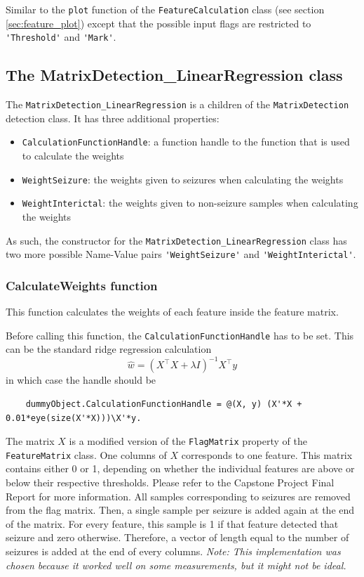\documentclass[usletter, 11pt]{extarticle}
\begin{document}
Similar to the \verb|plot| function of the \verb|FeatureCalculation| class (see section \ref{sec:feature_plot}) except that the possible input flags are restricted to \verb|'Threshold'| and \verb|'Mark'|.


\subsection{The MatrixDetection\_LinearRegression class} \label{sec:linear_regression}

The  \verb|MatrixDetection_LinearRegression| is a children of the \verb|MatrixDetection| detection class. It has three additional properties:

\begin{itemize}
	\item \texttt{CalculationFunctionHandle}: a function handle to the function that is used to calculate the weights
	\item \texttt{WeightSeizure}: the weights given to seizures when calculating the weights
	\item \texttt{WeightInterictal}: the weights given to non-seizure samples when calculating the weights
\end{itemize}

As such, the constructor for the \verb|MatrixDetection_LinearRegression| class has two more possible Name-Value pairs \verb|'WeightSeizure'| and \verb|'WeightInterictal'|.

\subsubsection{CalculateWeights function}

This function calculates the weights of each feature inside the feature matrix. 

Before calling this function, the \verb|CalculationFunctionHandle| has to be set. This can be the standard ridge regression calculation $$\hat{w} = (X^{\top}X + \lambda I)^{-1} X^{\top}y$$ in which case the handle should be
\begin{Verbatim}
	dummyObject.CalculationFunctionHandle = @(X, y) (X'*X + 0.01*eye(size(X'*X)))\X'*y.
\end{Verbatim}

The matrix $X$ is a modified version of the \verb|FlagMatrix| property of the \verb|FeatureMatrix| class. One columns of $X$ corresponds to one feature. This matrix contains either 0 or 1, depending on whether the individual features are above or below their respective thresholds. Please refer	 to the Capstone Project Final Report for more information. All samples corresponding to seizures are removed from the flag matrix. Then, a single sample per seizure is added again at the end of the matrix. For every feature, this sample is 1 if that feature detected that seizure and zero otherwise. Therefore, a vector of length equal to the number of seizures is added at the end of every columns. \emph{Note: This implementation was chosen because it worked well on some measurements, but it might not be ideal.}
\end{document}
